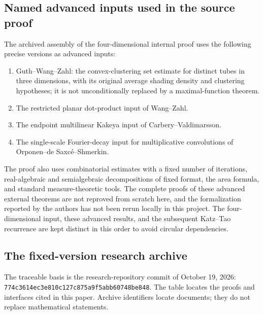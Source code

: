 \subsection{Named advanced inputs used in the source proof}
The archived assembly of the four-dimensional internal proof\cite{ArchiveSource} uses the following precise versions as advanced inputs:
\begin{enumerate}
 \item Guth--Wang--Zahl\cite[Theorem 1.1]{GWZ}: the convex-clustering set estimate for distinct tubes in three dimensions,
  with its original average shading density and clustering hypotheses; it is not unconditionally replaced by a maximal-function theorem.
 \item The restricted planar dot-product input of Wang--Zahl\cite[Definition 4.2, Theorem 5.2]{WZ}.
 \item The endpoint multilinear Kakeya input of Carbery--Valdimarsson\cite[Theorem 1]{CV}.
 \item The single-scale Fourier-decay input for multiplicative convolutions of Orponen--de Saxc\'e--Shmerkin\cite[Theorem 1.5]{OSS}.
\end{enumerate}
The proof also uses combinatorial estimates with a fixed number of iterations, real-algebraic and semialgebraic decompositions of fixed format,
the area formula, and standard measure-theoretic tools.
The complete proofs of these advanced external theorems are not reproved from scratch here,
and the formalization reported by the authors has not been rerun locally in this project.
The four-dimensional input, these advanced results, and the subsequent Katz--Tao recurrence are kept distinct in this order to avoid circular dependencies.

\subsection{The fixed-version research archive}
The traceable basis is the research-repository commit of October 19, 2026:
\texttt{774c3614ec3e810c127c875a9f5abb60748be848}.
The table locates the proofs and interfaces cited in this paper.
Archive identifiers locate documents; they do not replace mathematical statements.


